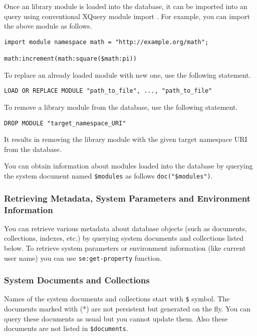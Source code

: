 \documentclass[a4paper,12pt]{article}
\begin{document}
Once an library module is loaded into the database, it can be imported into an query using conventional XQuery module import \cite{paper:query-language}. For example, you can import the above module as follows.

\begin{verbatim}
import module namespace math = "http://example.org/math";

math:increment(math:square($math:pi))

\end{verbatim}


To replace an already loaded module with new one, use the following statement.

\begin{verbatim}
LOAD OR REPLACE MODULE "path_to_file", ..., "path_to_file"
\end{verbatim}

To remove a library module from the database, use the following statement.

\begin{verbatim}
DROP MODULE "target_namespace_URI"
\end{verbatim}

It results in removing the library module with the given target namespace URI from the database.

You can obtain information about modules loaded into the database by querying the system document named \verb!$modules! as follows \verb!doc("$modules")!.


\subsubsection{Retrieving Metadata, System Parameters and Environment Information}
\label{managing-metadata}
You can retrieve various metadata about database objects (such as documents, collections, indexes, etc.) by querying system documents and collections listed below. 
To retrieve system parameters or environment information (like current user name) you can use \verb!se:get-property! function.

\subsubsection*{System Documents and Collections}

Names of the system documents and collections start with \verb!$! symbol. The documents marked with (*) are not persistent but generated on the fly. You can query these documents as usual but you cannot update them.
Also these documents are not listed in \verb!$documents!.
\end{document}

